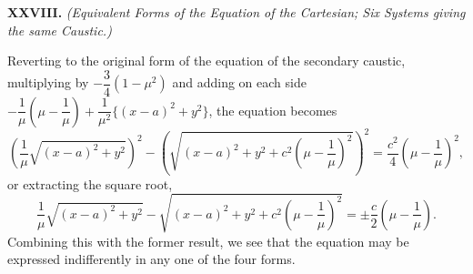 \documentclass[12pt,a4paper]{article}
\theoremstyle{definition}
\begin{document}
\medskip\noindent\textbf{XXVIII.}
\textit{(Equivalent Forms of the Equation of the Cartesian; Six Systems giving
the same Caustic.)}

Reverting to the original form of the equation of the secondary
caustic, multiplying by $-\dfrac{3}{4}(1 - \mu^{2})$ and adding on each side
$-\dfrac{1}{\mu} \left( \mu - \dfrac{1}{\mu} \right) + \dfrac{1}{\mu^{2}} \{ (x - a)^{2} + y^{2} \}$,
the equation becomes
\[
\left( \frac{1}{\mu} \sqrt{(x - a)^{2} + y^{2}} \right)^{2}
- \left( \sqrt{(x - a)^{2} + y^{2} + c^{2} \left( \mu - \frac{1}{\mu} \right)^{2}} \right)^{2}
= \frac{c^{2}}{4} \left( \mu - \frac{1}{\mu} \right)^{2},
\]
or extracting the square root,
\[
\frac{1}{\mu} \sqrt{(x - a)^{2} + y^{2}}
- \sqrt{(x - a)^{2} + y^{2} + c^{2} \left( \mu - \frac{1}{\mu} \right)^{2}}
= \pm \frac{c}{2} \left( \mu - \frac{1}{\mu} \right).
\]
Combining this with the former result, we see that the equation
may be expressed indifferently in any one of the four forms.
\end{document}

